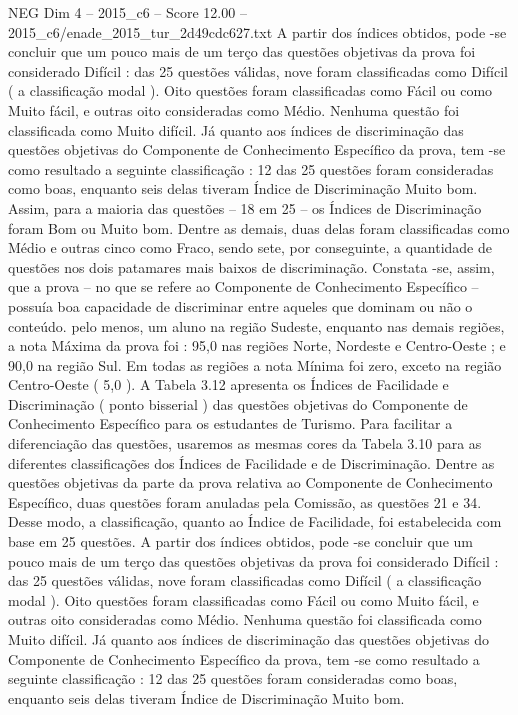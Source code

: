 \begin{textsample}{NEG Dim 4 – 2015\_c6 – Score 12.00 – 2015\_c6/enade\_2015\_tur\_2d49cdc627.txt}
A partir dos índices obtidos, pode -se concluir que um pouco mais de um terço das questões objetivas da prova foi considerado Difícil : das 25 questões válidas, nove foram classificadas como Difícil ( a classificação modal ).
Oito questões foram classificadas como Fácil ou como Muito fácil, e outras oito consideradas como Médio.
Nenhuma questão foi classificada como Muito difícil.
Já quanto aos índices de discriminação das questões objetivas do Componente de Conhecimento Específico da prova, tem -se como resultado a seguinte classificação : 12 das 25 questões foram consideradas como boas, enquanto seis delas tiveram Índice de Discriminação Muito bom.
Assim, para a maioria das questões – 18 em 25 – os Índices de Discriminação foram Bom ou Muito bom.
Dentre as demais, duas delas foram classificadas como Médio e outras cinco como Fraco, sendo sete, por conseguinte, a quantidade de questões nos dois patamares mais baixos de discriminação.
Constata -se, assim, que a prova – no que se refere ao Componente de Conhecimento Específico – possuía boa capacidade de discriminar entre aqueles que dominam ou não o conteúdo. pelo menos, um aluno na região Sudeste, enquanto nas demais regiões, a nota Máxima da prova foi : 95,0 nas regiões Norte, Nordeste e Centro-Oeste ; e 90,0 na região Sul.
Em todas as regiões a nota Mínima foi zero, exceto na região Centro-Oeste ( 5,0 ).
A Tabela 3.12 apresenta os Índices de Facilidade e Discriminação ( ponto bisserial ) das questões objetivas do Componente de Conhecimento Específico para os estudantes de Turismo.
Para facilitar a diferenciação das questões, usaremos as mesmas cores da Tabela 3.10 para as diferentes classificações dos Índices de Facilidade e de Discriminação.
Dentre as questões objetivas da parte da prova relativa ao Componente de Conhecimento Específico, duas questões foram anuladas pela Comissão, as questões 21 e 34.
Desse modo, a classificação, quanto ao Índice de Facilidade, foi estabelecida com base em 25 questões.
A partir dos índices obtidos, pode -se concluir que um pouco mais de um terço das questões objetivas da prova foi considerado Difícil : das 25 questões válidas, nove foram classificadas como Difícil ( a classificação modal ).
Oito questões foram classificadas como Fácil ou como Muito fácil, e outras oito consideradas como Médio.
Nenhuma questão foi classificada como Muito difícil.
Já quanto aos índices de discriminação das questões objetivas do Componente de Conhecimento Específico da prova, tem -se como resultado a seguinte classificação : 12 das 25 questões foram consideradas como boas, enquanto seis delas tiveram Índice de Discriminação Muito bom.

\end{textsample}
